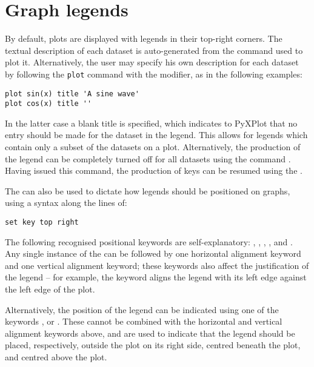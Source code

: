 \section{Graph legends}
\label{sec:legends}

By default, plots are displayed with legends in their top-right corners. The
textual description of each dataset is auto-generated from the command used
to plot it. Alternatively, the user may specify his own description for each
dataset by following the {\tt plot} command with the  modifier,
as in the following examples:

\begin{verbatim}
plot sin(x) title 'A sine wave'
plot cos(x) title ''
\end{verbatim}

In the latter case a blank title is specified, which indicates to PyXPlot that
no entry should be made for the dataset in the legend. This allows for legends
which contain only a subset of the datasets on a plot. Alternatively, the
production of the legend can be completely turned off for all datasets using
the command . Having issued this command, the production of
keys can be resumed using the .

The  can also be used to dictate how legends should be
positioned on graphs, using a syntax along the lines of:

\begin{verbatim}
set key top right
\end{verbatim}

The following recognised positional keywords are self-explanatory:
, , , ,
 and . Any single instance of the
 can be followed by one horizontal alignment keyword and one
vertical alignment keyword; these keywords also affect the justification of the
legend -- for example, the keyword  aligns the legend with its
left edge against the left edge of the plot.

Alternatively, the position of the legend can be indicated using one of the
keywords ,  or . These cannot be
combined with the horizontal and vertical alignment keywords above, and are
used to indicate that the legend should be placed, respectively, outside the
plot on its right side, centred beneath the plot, and centred above the plot.

